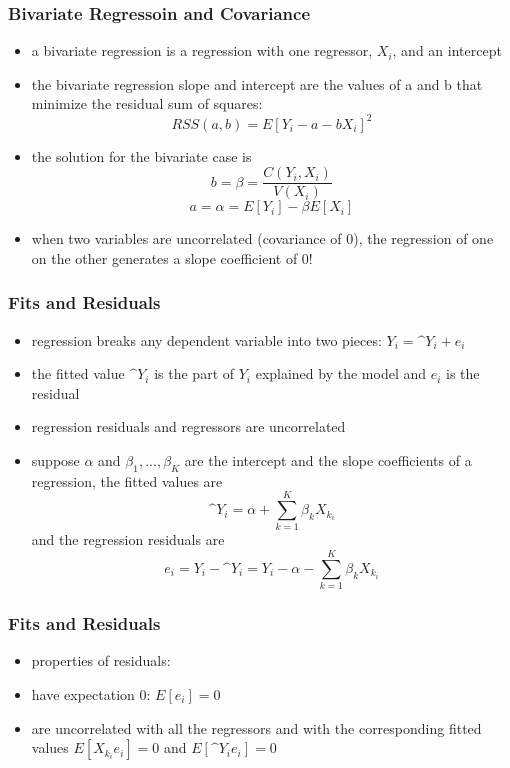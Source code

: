\documentclass{beamer}
\begin{document}

\begin{frame}
\frametitle{Bivariate Regressoin and Covariance}
	\begin{itemize}
		\item a bivariate regression is a regression with one regressor, $X_i$, and an intercept
		\item the bivariate regression slope and intercept are the values of a and b that minimize the residual sum of squares: $$RSS(a,b) = E[Y_i-a-bX_i]^2$$
		\item the solution for the bivariate case is $$b = \beta = \frac{C(Y_i, X_i)}{ V(X_i)}$$ $$a= \alpha = E[Y_i]- \beta E[X_i]$$
		\item when two variables are uncorrelated (covariance of 0), the regression of one on the other generates a slope coefficient of 0!
	\end{itemize}

\end{frame}


\begin{frame}
\frametitle{Fits and Residuals}
	\begin{itemize}
		\item regression breaks any dependent variable into two pieces: $Y_i = \^{Y}_i + e_i$
		\item the fitted value $\^{Y}_i$ is the part of $Y_i$ explained by the model and $e_i$ is the residual
		\item regression residuals and regressors are uncorrelated
		\item suppose $\alpha$ and $\beta_1,...,\beta_K$ are the intercept and the slope coefficients of a regression, the fitted values are $$\^{Y}_i = \alpha + \sum_{k=1}^K{{\beta_kX_k_i}}$$ and the regression residuals are \\
		
		$$e_i = Y_i - \^{Y}_i = Y_i - \alpha - \sum_{k=1}^K{{\beta_kX_k_i}}$$
	\end{itemize}

\end{frame}


\begin{frame}
\frametitle{Fits and Residuals}
	\begin{itemize}
		\item properties of residuals:
		\item have expectation 0: $E[e_i]=0$
		\item are uncorrelated with all the regressors and with the corresponding fitted values $E[X_k_ie_i]=0$ and $E[\^{Y}_ie_i]=0$
	\end{itemize}

\end{frame}
\end{document}
